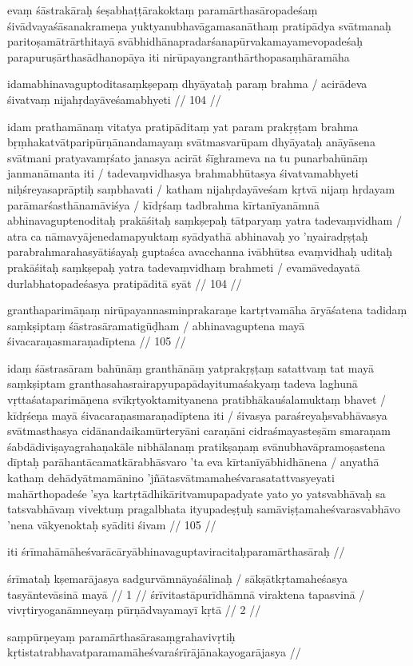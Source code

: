 evaṃ śāstrakāraḥ śeṣabhaṭṭārakoktaṃ paramārthasāropadeśaṃ śivādvayaśāsanakrameṇa yuktyanubhavāgamasanāthaṃ pratipādya svātmanaḥ paritoṣamātrārthitayā svābhidhānapradarśanapūrvakamayamevopadeśaḥ parapuruṣārthasādhanopāya iti nirūpayangranthārthopasaṃhāramāha

idamabhinavaguptoditasaṃkṣepaṃ dhyāyataḥ paraṃ brahma  /
acirādeva śivatvaṃ nijahṛdayāveśamabhyeti  // 104  //

idam prathamānaṃ vitatya pratipāditaṃ yat param prakṛṣṭam brahma bṛṃhakatvātparipūrṇānandamayaṃ svātmasvarūpam dhyāyataḥ anāyāsena svātmani pratyavamṛśato janasya acirāt śīghrameva na tu punarbahūnāṃ janmanāmanta iti  / tadevaṃvidhasya brahmabhūtasya śivatvamabhyeti niḥśreyasaprāptiḥ saṃbhavati  / katham nijahṛdayāveśam kṛtvā nijaṃ hṛdayam parāmarśasthānamāviśya  / kīdṛśaṃ tadbrahma kīrtanīyanāmnā abhinavaguptenoditaḥ prakāśitaḥ saṃkṣepaḥ tātparyaṃ yatra tadevaṃvidham  / atra ca nāmavyājenedamapyuktaṃ syādyathā abhinavaḥ yo 'nyairadṛṣṭaḥ parabrahmarahasyātiśayaḥ guptaśca avacchanna ivābhūtsa evaṃvidhaḥ uditaḥ prakāśitaḥ saṃkṣepaḥ yatra tadevaṃvidhaṃ brahmeti  / evamāvedayatā durlabhatopadeśasya pratipāditā syāt  // 104  //

granthaparimāṇaṃ nirūpayannasminprakaraṇe kartṛtvamāha
āryāśatena tadidaṃ saṃkṣiptaṃ śāstrasāramatigūḍham  /
abhinavaguptena mayā śivacaraṇasmaraṇadīptena  // 105  //

idaṃ śāstrasāram bahūnāṃ granthānāṃ yatprakṛṣṭaṃ satattvaṃ tat mayā saṃkṣiptam granthasahasrairapyupapādayitumaśakyaṃ tadeva laghunā vṛttaśataparimāṇena svīkṛtyoktamityanena pratibhākauśalamuktaṃ bhavet  / kīdṛśeṇa mayā śivacaraṇasmaraṇadīptena iti  / śivasya paraśreyaḥsvabhāvasya svātmasthasya cidānandaikamūrteryāni caraṇāni cidraśmayasteṣām smaraṇam śabdādiviṣayagrahaṇakāle nibhālanaṃ pratikṣaṇaṃ svānubhavāpramoṣastena dīptaḥ parāhantācamatkārabhāsvaro 'ta eva kīrtanīyābhidhānena  / anyathā kathaṃ dehādyātmamānino 'jñātasvātmamaheśvarasatattvasyeyati mahārthopadeśe 'sya kartṛtādhikāritvamupapadyate yato yo yatsvabhāvaḥ sa tatsvabhāvaṃ vivektuṃ pragalbhata ityupadeṣṭuḥ samāviṣṭamaheśvarasvabhāvo 'nena vākyenoktaḥ syāditi śivam  // 105  //

iti śrīmahāmāheśvarācāryābhinavaguptaviracitaḥparamārthasāraḥ  //

śrīmataḥ kṣemarājasya sadgurvāmnāyaśālinaḥ  /
sākṣātkṛtamaheśasya tasyāntevāsinā mayā  // 1  //
śrīvitastāpurīdhāmnā viraktena tapasvinā  /
vivṛtiryoganāmneyaṃ pūrṇādvayamayī kṛtā  // 2  //

saṃpūrṇeyaṃ paramārthasārasaṃgrahavivṛtiḥ kṛtistatrabhavatparamamāheśvaraśrīrājānakayogarājasya  //
